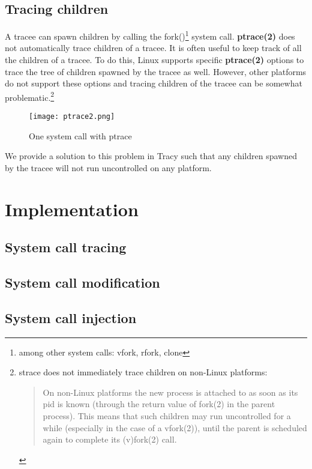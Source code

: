 \documentclass[a4paper, twoside, 10pt, twocolumn]{report}
\begin{document}
\section{Tracing children}

A tracee can spawn children by calling the fork()\footnote{among other system
calls: vfork, rfork, clone} system call. \textbf{ptrace(2)} does not
automatically trace children of a tracee. It is often useful to keep track of
all the children of a tracee. To do this, Linux supports specific
\textbf{ptrace(2)} options to trace the tree of children spawned by the tracee
as well. However, other platforms do not support these options and tracing
children of the tracee can be somewhat problematic.\footnote{strace does not
immediately trace children on non-Linux platforms:
\begin{quote}
    On non-Linux platforms the new process is attached to as soon as its pid is
    known (through the return value of fork(2) in the parent process).
    This means that such children may run uncontrolled for a while
    (especially in the case of a vfork(2)), until the parent is scheduled
    again to complete its (v)fork(2)  call.
\end{quote}
}

\begin{figure}
\label{fig2}
\texttt{[image: ptrace2.png]}
\caption{One system call with ptrace}
\end{figure}

We provide a solution to this problem in Tracy such that any children spawned
by the tracee will not run uncontrolled on any platform.

\chapter{Implementation}

\section{System call tracing}


\section{System call modification}

\section{System call injection}
\end{document}
